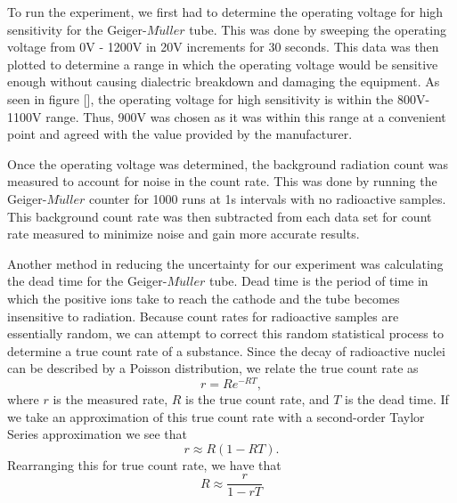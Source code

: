 
\par \indent To run the experiment, we first had to determine the operating voltage for high sensitivity for the Geiger-$M\ddot{u}ller$ tube. This was done by sweeping the operating voltage from 0V - 1200V in 20V increments for 30 seconds. This data was then plotted to determine a range in which the operating voltage would be sensitive enough without causing dialectric breakdown and damaging the equipment. As seen in figure [], the operating voltage for high sensitivity is within the 800V-1100V range. Thus, 900V was chosen as it was within this range at a convenient point and agreed with the value provided by the manufacturer.

\par Once the operating voltage was determined, the background radiation count was measured to account for noise in the count rate. This was done by running the Geiger-$M\ddot{u}ller$ counter for 1000 runs at 1s intervals with no radioactive samples. This background count rate was then subtracted from each data set for count rate measured to minimize noise and gain more accurate results.

\par Another method in reducing the uncertainty for our experiment was calculating the dead time for the Geiger-$M\ddot{u}ller$ tube. Dead time is the period of time in which the positive ions take to reach the cathode and the tube becomes insensitive to radiation. Because count rates for radioactive samples are essentially random, we can attempt to correct this random statistical process to determine a true count rate of a substance.  Since the decay of radioactive nuclei can be described by a Poisson distribution, we relate the true count rate as
\begin{equation}
r = Re^{-RT},
\label{eq:ActualCountRate}
\end{equation}
where $r$ is the measured rate, $R$ is the true count rate, and $T$ is the dead time. If we take an approximation of this true count rate with a second-order Taylor Series approximation we see that
\begin{equation}
r \approx R(1-RT).
\label{eq:ApproxCountRate}
\end{equation}
Rearranging this for true count rate, we have that
\begin{equation}
R \approx \frac{r}{1-rT}
\label{eq:TrueCountRate}
\end{equation}

